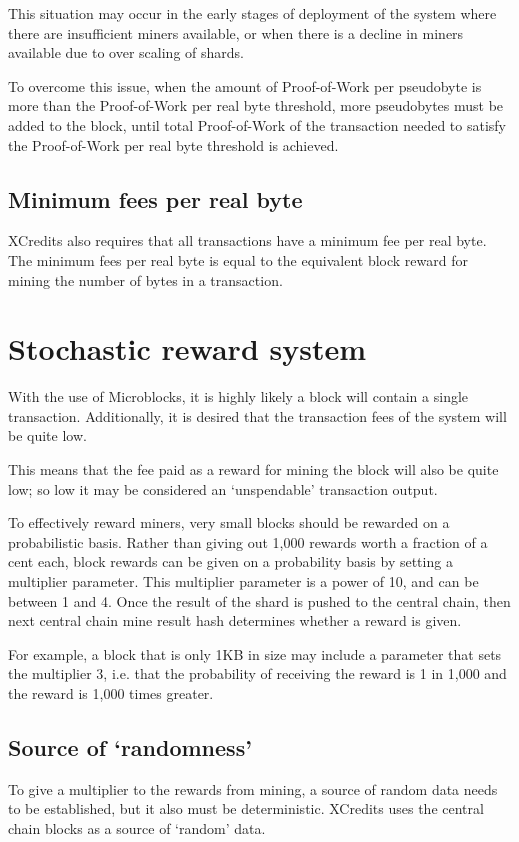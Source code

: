 \documentclass[a4paper,12pt]{article}
\begin{document}
This situation may occur in the early stages of deployment of the system where there are insufficient miners available, or when there is a decline in miners available due to over scaling of shards. 

To overcome this issue, when the amount of Proof-of-Work per pseudobyte is more than the Proof-of-Work per real byte threshold, more pseudobytes must be added to the block, until total Proof-of-Work of the transaction needed to satisfy the Proof-of-Work per real byte threshold is achieved.


\subsection{Minimum fees per real byte}
XCredits also requires that all transactions have a minimum fee per real byte. The minimum fees per real byte is equal to the equivalent block reward for mining the number of bytes in a transaction. 






\section{Stochastic reward system}
With the use of Microblocks, it is highly likely a block will contain a single transaction. Additionally, it is desired that the transaction fees of the system will be quite low.

This means that the fee paid as a reward for mining the block will also be quite low; so low it may be considered an `unspendable' transaction output.

To effectively reward miners, very small blocks should be rewarded on a probabilistic basis. Rather than giving out 1,000 rewards worth a fraction of a cent each, block rewards can be given on a probability basis by setting a multiplier parameter. This multiplier parameter is a power of 10, and can be between 1 and 4. Once the result of the shard is pushed to the central chain, then next central chain mine result hash determines whether a reward is given. 

For example, a block that is only 1KB in size may include a parameter that sets the multiplier 3, i.e. that the probability of receiving the reward is 1 in 1,000 and the reward is 1,000 times greater. 

\subsection{Source of `randomness'}
To give a multiplier to the rewards from mining, a source of random data needs to be established, but it also must be deterministic. XCredits uses the central chain blocks as a source of `random' data. 
\end{document}
